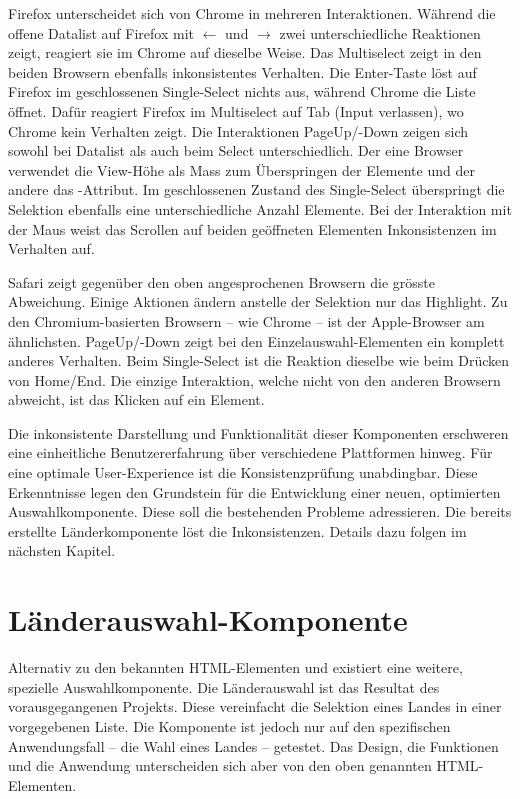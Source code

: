 Firefox unterscheidet sich von Chrome in mehreren Interaktionen. 
Während die offene Datalist auf Firefox mit $\leftarrow$ und $\rightarrow$ zwei unterschiedliche Reaktionen zeigt, reagiert sie im Chrome auf dieselbe Weise. 
Das Multiselect zeigt in den beiden Browsern ebenfalls inkonsistentes Verhalten. 
Die Enter-Taste löst auf Firefox im geschlossenen Single-Select nichts aus, während Chrome die Liste öffnet. 
Dafür reagiert Firefox im Multiselect auf Tab (Input verlassen), wo Chrome kein Verhalten zeigt. 
Die Interaktionen PageUp/-Down zeigen sich sowohl bei Datalist als auch beim Select unterschiedlich. 
Der eine Browser verwendet die View-Höhe als Mass zum Überspringen der Elemente und der andere das -Attribut. 
Im geschlossenen Zustand des Single-Select überspringt die Selektion ebenfalls eine unterschiedliche Anzahl Elemente. 
Bei der Interaktion mit der Maus weist das Scrollen auf beiden geöffneten Elementen Inkonsistenzen im Verhalten auf. 

Safari zeigt gegenüber den oben angesprochenen Browsern die grösste Abweichung. 
Einige Aktionen ändern anstelle der Selektion nur das Highlight. 
Zu den Chromium-basierten Browsern – wie Chrome – ist der Apple-Browser am ähnlichsten. 
PageUp/-Down zeigt bei den Einzelauswahl-Elementen ein komplett anderes Verhalten. 
Beim Single-Select ist die Reaktion dieselbe wie beim Drücken von Home/End. 
Die einzige Interaktion, welche nicht von den anderen Browsern abweicht, ist das Klicken auf ein Element. 

Die inkonsistente Darstellung und Funktionalität dieser Komponenten erschweren eine einheitliche Benutzererfahrung über verschiedene Plattformen hinweg. 
Für eine optimale User-Experience ist die Konsistenzprüfung unabdingbar. 
Diese Erkenntnisse legen den Grundstein für die Entwicklung einer neuen, optimierten Auswahlkomponente. 
Diese soll die bestehenden Probleme adressieren. 
Die bereits erstellte Länderkomponente löst die Inkonsistenzen. 
Details dazu folgen im nächsten Kapitel. 


\section{Länderauswahl-Komponente}
\label{sec:countryChoice}

Alternativ zu den bekannten HTML-Elementen  und  existiert eine weitere, spezielle Auswahlkomponente. 
Die Länderauswahl\citemarktext{
    [\cite{ip5}]
} ist das Resultat des vorausgegangenen Projekts. 
Diese vereinfacht die Selektion eines Landes in einer vorgegebenen Liste. 
Die Komponente ist jedoch nur auf den spezifischen Anwendungsfall – die Wahl eines Landes – getestet. 
Das Design, die Funktionen und die Anwendung unterscheiden sich aber von den oben genannten HTML-Elementen.


